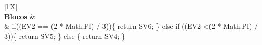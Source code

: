 \begin{xltabular}{\textwidth}{|l|X|}
		 \\ \hline
		\textbf{Blocos} &  \\ \hline
		 & if((EV2 == (2 * Math.PI) / 3))\{   return SV6; \} else if ((EV2 \textless (2 * Math.PI) / 3))\{   return SV5; \} else \{   return SV4; \} \\ \hline


\end{xltabular}
